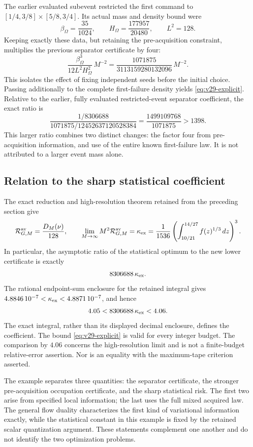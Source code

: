 The earlier evaluated subevent restricted the first command to
$[1/4,3/8]\times[5/8,3/4]$. Its actual mass and density bound were
\[
 \beta_{\Omega}=\frac{35}{1024},\qquad
 H_{\Omega}=\frac{177957}{20480},\qquad L^2=128.
\]
Keeping exactly these data, but retaining the pre-acquisition constraint,
multiplies the previous separator certificate by four:
\begin{equation}\label{eq:v29-restricted}
 \frac{\beta_{\Omega}^3}{12L^2H_{\Omega}^2}\,M^{-2}
    =\frac{1071875}{3113159280132096}\,M^{-2}.
\end{equation}
This isolates the effect of fixing independent seeds before the initial
choice. Passing additionally to the complete first-failure density
yields \eqref{eq:v29-explicit}. Relative to the earlier, fully evaluated
restricted-event separator coefficient, the exact ratio is
\begin{equation}\label{eq:v29-improvement}
 \frac{1/8306688}{1071875/12452637120528384}
                    =\frac{1499109768}{1071875}>1398.
\end{equation}
This larger ratio combines two distinct changes: the factor four from
pre-acquisition information, and use of the entire known first-failure
law. It is not attributed to a larger event mass alone.

\subsection{Relation to the sharp statistical coefficient}
The exact reduction and high-resolution theorem retained from the
preceding section give
\begin{equation}\label{eq:v29-sharp-retained}
 \mathcal R^{\rm av}_{G,M}=\frac{D_M(\nu)}{128},\qquad
 \lim_{M\to\infty}M^2\mathcal R^{\rm av}_{G,M}
  =\kappa_{\rm ex}
  =\frac1{1536}\left(\int_{10/21}^{14/27}f(z)^{1/3}\,dz\right)^3.
\end{equation}
In particular, the asymptotic ratio of the statistical optimum to the
new lower certificate is exactly
\begin{equation}\label{eq:v29-gap}
                  8306688\,\kappa_{\rm ex}.
\end{equation}
The rational endpoint-sum enclosure for the retained integral gives
$4.8846\,10^{-7}<\kappa_{\rm ex}<4.8871\,10^{-7}$, and hence
\[
                     4.05<8306688\,\kappa_{\rm ex}<4.06.
\]
The exact integral, rather than its displayed decimal enclosure, defines
the coefficient. The bound \eqref{eq:v29-explicit} is valid for every
integer budget. The comparison by $4.06$ concerns the high-resolution
limit and is not a finite-budget relative-error assertion. Nor is an
equality with the maximum-tape criterion asserted.

The example separates three quantities: the separator certificate, the
stronger pre-acquisition occupation certificate, and the sharp statistical
risk. The first two arise from specified local information; the last
uses the full mixed acquired law. The general flow duality characterizes
the first kind of variational information exactly, while the statistical
constant in this example is fixed by the retained scalar quantization
argument. These statements complement one another and do not identify
the two optimization problems.
